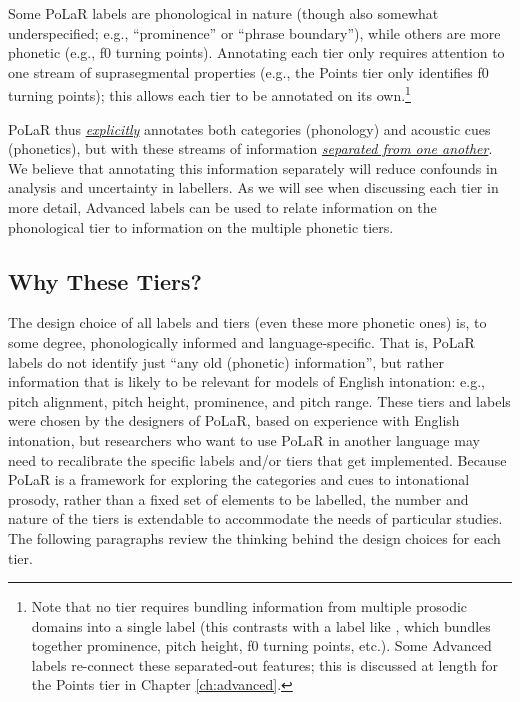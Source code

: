 \documentclass[11pt, twoside]{memoir}
\def\polar#1{{\relsize{-.5}\fontspec[Mapping=tex-text]{Roboto Mono}{#1}}}
\def\tobi#1{\polar{#1}}
\begin{document}
Some PoLaR labels are phonological in nature (though also somewhat underspecified; e.g., “prominence” or “phrase boundary”), while others are more phonetic (e.g., f0 turning points). Annotating each tier only requires attention to one stream of suprasegmental properties (e.g., the Points tier only identifies f0 turning points); this allows each tier to be annotated on its own.\footnote{Note that no tier requires bundling information from multiple prosodic domains into a single label (this contrasts with a label like \tobi{H*}, which bundles together prominence, pitch height, f0 turning points, etc.). Some Advanced labels re-connect these separated-out features; this is discussed at length for the Points tier in Chapter \ref{ch:advanced}.\label{fn:no bundling}}

PoLaR thus \textit{\uline{explicitly}} annotates both categories (phonology) and acoustic cues (phonetics), but with these streams of information \textit{\uline{separated from one another}}. We believe that annotating this information separately will reduce confounds in analysis and uncertainty in labellers. As we will see when discussing each tier in more detail, Advanced labels can be used to relate information on the phonological tier to information on the multiple phonetic tiers.

\subsection{Why These Tiers?}\label{sec:why-these-tiers}

The design choice of all labels and tiers (even these more phonetic ones) is, to some degree, phonologically informed and language-specific. That is, PoLaR labels do not identify just “any old (phonetic) information”, but rather information that is likely to be relevant for models of English intonation: e.g., pitch alignment, pitch height, prominence, and pitch range. These tiers and labels were chosen by the designers of PoLaR, based on experience with English intonation, but researchers who want to use PoLaR in another language may need to recalibrate the specific labels and/or tiers that get implemented. Because PoLaR is a framework for exploring the categories and cues to intonational prosody, rather than a fixed set of elements to be labelled, the number and nature of the tiers is extendable to accommodate the needs of particular studies. The following paragraphs review the thinking behind the design choices for each tier.
\end{document}
